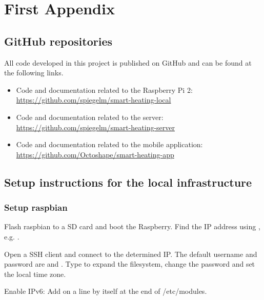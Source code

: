 
\chapter{First Appendix}
\label{sec:first_appendix}

\section{GitHub repositories}

All code developed in this project is published on GitHub and can be found at the following links.

\begin{itemize}
	\item{Code and documentation related to the Raspberry Pi 2:\\ \url{https://github.com/spiegelm/smart-heating-local}}
	
	\item{Code and documentation related to the server:\\ \url{https://github.com/spiegelm/smart-heating-server}}
	
	\item{Code and documentation related to the mobile application:\\ \url{https://github.com/Octoshape/smart-heating-app}}
\end{itemize}

\section{Setup instructions for the local infrastructure}

\subsection{Setup raspbian}\label{setup-raspbian}

Flash raspbian to a SD card and boot the Raspberry. Find the IP address
using , e.g.
.

Open a SSH client and connect to the determined IP. The default username
and password are  and . Type
 to expand the filesystem, change the
password and set the local time zone.

Enable IPv6: Add  on a line by itself at the end of
/etc/modules.

